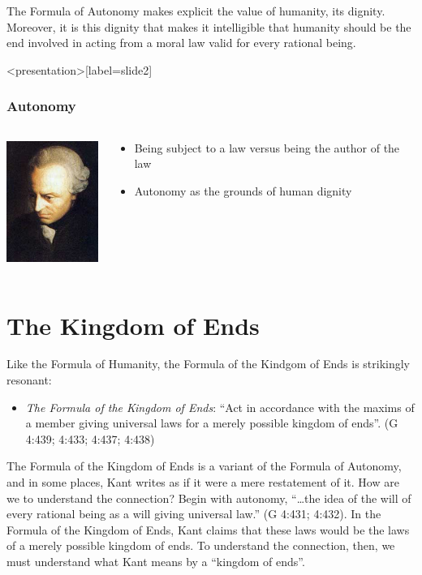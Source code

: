 The Formula of Autonomy makes explicit the value of humanity, its dignity. Moreover, it is this dignity that makes it intelligible that humanity should be the end involved in acting from a moral law valid for every rational being. \change

\begin{frame}<presentation>[label=slide2]
    \frametitle{Autonomy}
        \begin{columns}
            \begin{column}{3cm}
                \includegraphics[height=4cm]{../../../graphics/kant.jpg}
            \end{column}
            \begin{column}{7cm}
                \begin{itemize}
                    \item \alert{Being subject to a law} versus \alert{being the author of the law}
                    \item Autonomy as the grounds of human dignity
                \end{itemize}
            \end{column}
        \end{columns}
\end{frame}

\section{The Kingdom of Ends}

Like the Formula of Humanity, the Formula of the Kindgom of Ends is strikingly resonant:
\begin{itemize}
    \item \emph{The Formula of the Kingdom of Ends}: ``Act in accordance with the maxims of a member giving universal laws for a merely possible kingdom of ends''. (G 4:439; 4:433; 4:437; 4:438)
\end{itemize}

The Formula of the Kingdom of Ends is a variant of the Formula of Autonomy, and in some places, Kant writes as if it were a mere restatement of it. How are we to understand the connection? Begin with autonomy, ``\ldots the idea of the will of every rational being as a will giving universal law.'' (G 4:431; 4:432). In the Formula of the Kingdom of Ends, Kant claims that these laws would be the laws of a merely possible kingdom of ends. To understand the connection, then, we must understand what Kant means by a ``kingdom of ends''.

